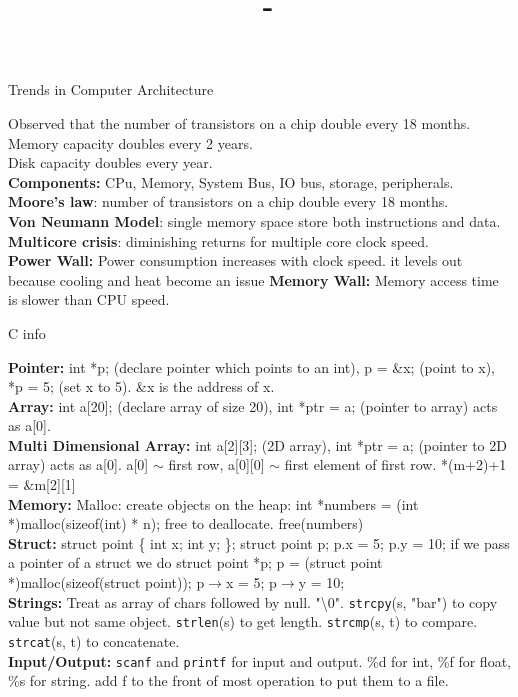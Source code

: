 \documentclass[answers,12pt,addpoints]{exam}
\author{\name}
\title{\course \ - \assignment}
\begin{document}
\begin{center}
    Trends in Computer Architecture
\end{center}
Observed that the number of transistors on a chip double every 18 months. \\
Memory capacity doubles every 2 years. \\
Disk capacity doubles every year. \\
\textbf{Components:} CPu, Memory, System Bus, IO bus, storage, peripherals. \\
\textbf{Moore's law}: number of transistors on a chip double every 18 months. \\
\textbf{Von Neumann Model}: single memory space store both instructions and data. \\
\textbf{Multicore crisis}: diminishing returns for multiple core clock speed.\\
\textbf{Power Wall:} Power consumption increases with clock speed. it levels out because cooling and heat become an issue
\textbf{Memory Wall:} Memory access time is slower than CPU speed. 
\begin{center}
    C info
\end{center}
\textbf{Pointer:}  int *p; (declare pointer which points to an int), p = \&x; (point to x), *p = 5; (set x to 5). \&x is the address of x. \\
\textbf{Array:} int a[20]; (declare array of size 20), int *ptr = a; (pointer to array) acts as a[0]. \\
\textbf{Multi Dimensional Array:} int a[2][3]; (2D array), int *ptr = a; (pointer to 2D array) acts as a[0]. a[0] $\sim$ first row, a[0][0] $\sim$ first element of first row. *(m+2)+1 = \&m[2][1]\\
\textbf{Memory:} Malloc: create objects on the heap: int *numbers = (int *)malloc(sizeof(int) * n); free to deallocate. free(numbers) \\
\textbf{Struct:} struct point \{ int x; int y; \}; struct point p; p.x = 5; p.y = 10; if we pass a pointer of a struct we do struct point *p; p = (struct point *)malloc(sizeof(struct point)); p$\to$x = 5; p$\to$y = 10; \\
\textbf{Strings:} Treat as array of chars followed by null. "\textbackslash 0". \texttt{strcpy}(s, "bar") to copy value but not same object. \texttt{strlen}(s) to get length. \texttt{strcmp}(s, t) to compare. \texttt{strcat}(s, t) to concatenate.\\
\textbf{Input/Output:} \texttt{scanf} and \texttt{printf} for input and output. \%d for int, \%f for float, \%s for string. add f to the front of most operation to put them to a file. 
\end{document}

